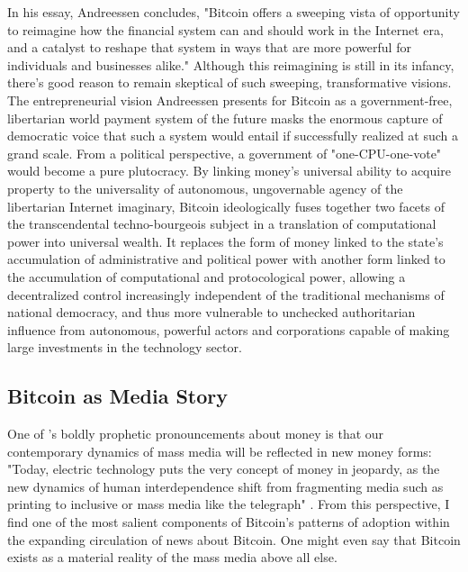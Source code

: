 In his essay, Andreessen concludes, "Bitcoin offers a sweeping vista of opportunity to reimagine how the financial system can and should work in the Internet era, and a catalyst to reshape that system in ways that are more powerful for individuals and businesses alike." Although this reimagining is still in its infancy, there's good reason to remain skeptical of such sweeping, transformative visions. The entrepreneurial vision Andreessen presents for Bitcoin as a government-free, libertarian world payment system of the future masks the enormous capture of democratic voice that such a system would entail if successfully realized at such a grand scale. From a political perspective, a government of "one-CPU-one-vote" would become a pure plutocracy. By linking money's universal ability to acquire property to the universality of autonomous, ungovernable agency of the libertarian Internet imaginary, Bitcoin ideologically fuses together two facets of the transcendental techno-bourgeois subject in a translation of computational power into universal wealth. It replaces the form of money linked to the state's accumulation of administrative and political power with another form linked to the accumulation of computational and protocological power, allowing a decentralized control increasingly independent of the traditional mechanisms of national democracy, and thus more vulnerable to unchecked authoritarian influence from autonomous, powerful actors and corporations capable of making large investments in the technology sector.

\subsection*{Bitcoin as Media Story}
One of \citeauthor{McLuhan64}'s boldly prophetic pronouncements about money is that our contemporary dynamics of mass media will be reflected in new money forms: "Today, electric technology puts the very concept of money in jeopardy, as the new dynamics of human interdependence shift from fragmenting media such as printing to inclusive or mass media like the telegraph" \autocite[139]{McLuhan64}. From this perspective, I find one of the most salient components of Bitcoin's patterns of adoption within the expanding circulation of news about Bitcoin. One might even say that Bitcoin exists as a material reality of the mass media above all else.

